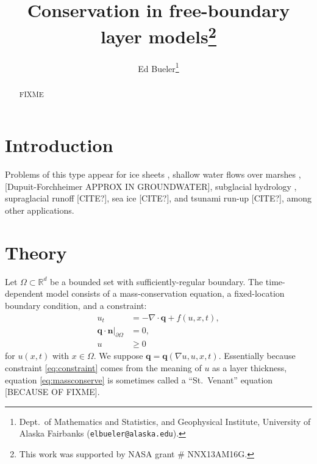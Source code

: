 \documentclass[final,leqno,onefignum,onetabnum]{siamltex1213bueler}
\title{Conservation in free-boundary layer models\thanks{This work was supported by NASA grant \# NNX13AM16G.}}
\author{Ed Bueler\thanks{Dept.~of Mathematics and Statistics, and Geophysical Institute, University of Alaska Fairbanks (\texttt{elbueler@alaska.edu}).}}
\newcommand\bn{\mathbf{n}}
\newcommand\bq{\mathbf{q}}
\newcommand{\Div}{\nabla\cdot}
\renewcommand{\grad}{\nabla}
\newcommand\RR{\mathbb{R}}
\begin{document}
\maketitle
{}%

\begin{abstract}
FIXME
\end{abstract}




\pagestyle{myheadings}
\thispagestyle{plain}

\section{Introduction}

Problems of this type appear for ice sheets \cite{JouvetBueler2012}, shallow water flows over marshes \cite{AlonsoSantillanaDawson}, [Dupuit-Forchheimer APPROX IN GROUNDWATER], subglacial hydrology \cite{AschwandenBuelerKhroulevBlatter,BuelervanPeltDRAFT,Schoofetal2012}, supraglacial runoff [CITE?], sea ice [CITE?], and tsunami run-up [CITE?], among other applications.

\section{Theory}

Let $\Omega \subset \RR^d$ be a bounded set with sufficiently-regular boundary.  The time-dependent model consists of a mass-conservation equation, a fixed-location boundary condition, and a constraint:
\begin{align}
u_t &= - \Div \bq + f(u,x,t), \label{eq:massconserve} \\
\bq \cdot \bn \Big|_{\partial\Omega} &= 0, \label{eq:fixedneumann} \\
u &\ge 0 \label{eq:constraint}
\end{align}
for $u(x,t)$ with $x\in \Omega$.  We suppose $\bq = \bq(\grad u, u, x, t)$.  Essentially because constraint \eqref{eq:constraint} comes from the meaning of $u$ as a layer thickness, equation \eqref{eq:massconserve} is sometimes called a ``St.~Venant'' equation [BECAUSE OF FIXME].
\end{document}
